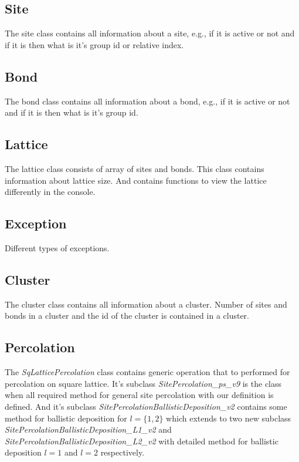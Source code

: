 	
	\subsection{Site}
	The site class contains all information about a site, e.g., if it is active or not and if it is then what is it's group id or relative index.
	
	
	\subsection{Bond}
	The bond class contains all information about a bond, e.g., if it is active or not and if it is then what is it's group id.
	
			
	\subsection{Lattice}
	The lattice class consists of array of sites and bonds. This class contains information about lattice size. And contains functions to view the lattice differently in the console.
	
	
	\subsection{Exception}
	Different types of exceptions.
	
	
	\subsection{Cluster}
	The cluster class contains all information about a cluster. Number of sites and bonds in a cluster and the id of the cluster is contained in a cluster.
	
	
	\subsection{Percolation}
	The \textit{SqLatticePercolation} class contains generic operation that to performed for percolation on square lattice. It's subclass  \textit{SitePercolation\_ps\_v9} is the class when all required method for general site percolation with our definition is defined. 
	And it's subclass \textit{SitePercolationBallisticDeposition\_v2}
	contains some method for ballistic deposition for $l=\{1,2\}$ which extends to two new subclass \textit{SitePercolationBallisticDeposition\_L1\_v2} and \textit{SitePercolationBallisticDeposition\_L2\_v2} with detailed method for ballistic deposition $l=1$ and $l=2$ respectively.
	
